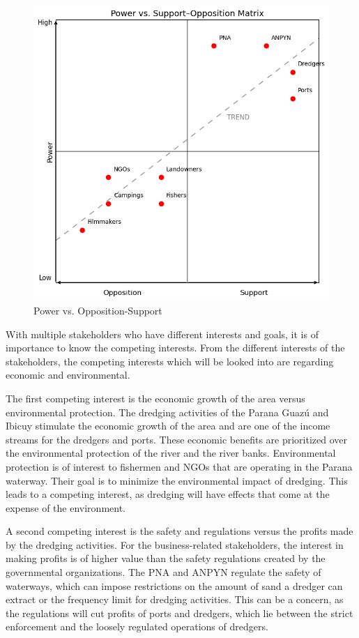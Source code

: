 \begin{figure}[H]
    \centering
    \includegraphics[width=0.70\linewidth]{figures/ch3/Support-OppositionVSPower.png}
    \caption{Power vs. Opposition-Support}
    \label{fig:support-opposition-power}
\end{figure}

With multiple stakeholders who have different interests and goals, it is of importance to know the competing interests. From the different interests of the stakeholders, the competing interests which will be looked into are regarding economic and environmental.

The first competing interest is the economic growth of the area versus environmental protection. The dredging activities of the Parana Guazú and Ibicuy stimulate the economic growth of the area and are one of the income streams for the dredgers and ports. These economic benefits are prioritized over the environmental protection of the river and the river banks. Environmental protection is of interest to fishermen and NGOs that are operating in the Parana waterway. Their goal is to minimize the environmental impact of dredging. This leads to a competing interest, as dredging will have effects that come at the expense of the environment.

A second competing interest is the safety and regulations versus the profits made by the dredging activities. For the business-related stakeholders, the interest in making profits is of higher value than the safety regulations created by the governmental organizations. The PNA and ANPYN regulate the safety of waterways, which can impose restrictions on the amount of sand a dredger can extract or the frequency limit for dredging activities. This can be a concern, as the regulations will cut profits of ports and dredgers, which lie between the strict enforcement and the loosely regulated operations of dredgers.

